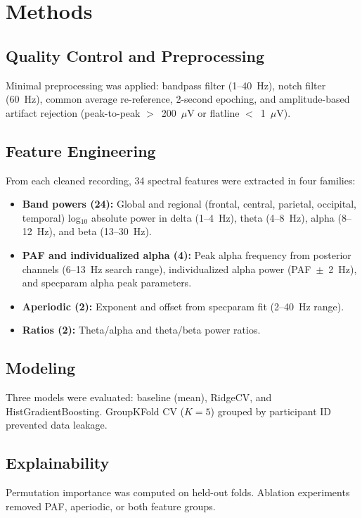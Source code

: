 \documentclass[12pt, a4paper]{article}
\begin{document}
\section{Methods}

\subsection{Quality Control and Preprocessing}
Minimal preprocessing was applied: bandpass filter (1--40~Hz), notch filter (60~Hz), common average re-reference, 2-second epoching, and amplitude-based artifact rejection (peak-to-peak $>$~200~$\mu$V or flatline $<$~1~$\mu$V).

\subsection{Feature Engineering}
From each cleaned recording, 34 spectral features were extracted in four families:

\begin{itemize}
    \item \textbf{Band powers (24):} Global and regional (frontal, central, parietal, occipital, temporal) log$_{10}$ absolute power in delta (1--4~Hz), theta (4--8~Hz), alpha (8--12~Hz), and beta (13--30~Hz).
    \item \textbf{PAF and individualized alpha (4):} Peak alpha frequency from posterior channels (6--13~Hz search range), individualized alpha power (PAF~$\pm$~2~Hz), and specparam alpha peak parameters.
    \item \textbf{Aperiodic (2):} Exponent and offset from specparam fit (2--40~Hz range).
    \item \textbf{Ratios (2):} Theta/alpha and theta/beta power ratios.
\end{itemize}

\subsection{Modeling}
Three models were evaluated: baseline (mean), RidgeCV, and HistGradientBoosting. GroupKFold CV ($K=5$) grouped by participant ID prevented data leakage.

\subsection{Explainability}
Permutation importance was computed on held-out folds. Ablation experiments removed PAF, aperiodic, or both feature groups.
\end{document}
